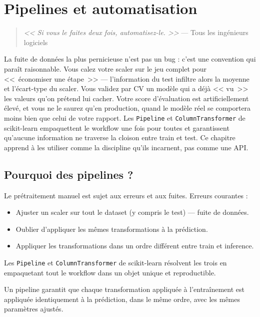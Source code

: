\chapter{Pipelines et automatisation}
\label{ch:pipelines}

\begin{quote}
\emph{<< Si vous le faites deux fois, automatisez-le. >>}
--- Tous les ing\'enieurs logiciels
\end{quote}

La fuite de données la plus pernicieuse n'est pas un bug : c'est une convention qui paraît raisonnable. Vous calez votre scaler sur le jeu complet pour <<~économiser une étape~>> --- l'information du test infiltre alors la moyenne et l'écart-type du scaler. Vous validez par CV un modèle qui a déjà << vu~>> les valeurs qu'on prétend lui cacher. Votre score d'évaluation est artificiellement élevé, et vous ne le saurez qu'en production, quand le modèle réel se comportera moins bien que celui de votre rapport. Les \texttt{Pipeline} et \texttt{ColumnTransformer} de scikit-learn empaquettent le workflow une fois pour toutes et garantissent qu'aucune information ne traverse la cloison entre train et test. Ce chapitre apprend à les utiliser comme la discipline qu'ils incarnent, pas comme une API.
\section{Pourquoi des pipelines ?}

Le pr\'etraitement manuel est sujet aux erreurs et aux fuites. Erreurs courantes :
\begin{itemize}
  \item Ajuster un scaler sur tout le dataset (y compris le test) --- fuite de donn\'ees.
  \item Oublier d'appliquer les m\^emes transformations \`a la pr\'ediction.
  \item Appliquer les transformations dans un ordre diff\'erent entre train et inference.
\end{itemize}

Les \texttt{Pipeline} et \texttt{ColumnTransformer} de scikit-learn r\'esolvent les trois en empaquetant tout le workflow dans un objet unique et reproductible.

\begin{datatip}
Un pipeline garantit que chaque transformation appliqu\'ee \`a l'entra\^inement est appliqu\'ee identiquement \`a la pr\'ediction, dans le m\^eme ordre, avec les m\^emes param\`etres ajust\'es.
\end{datatip}

